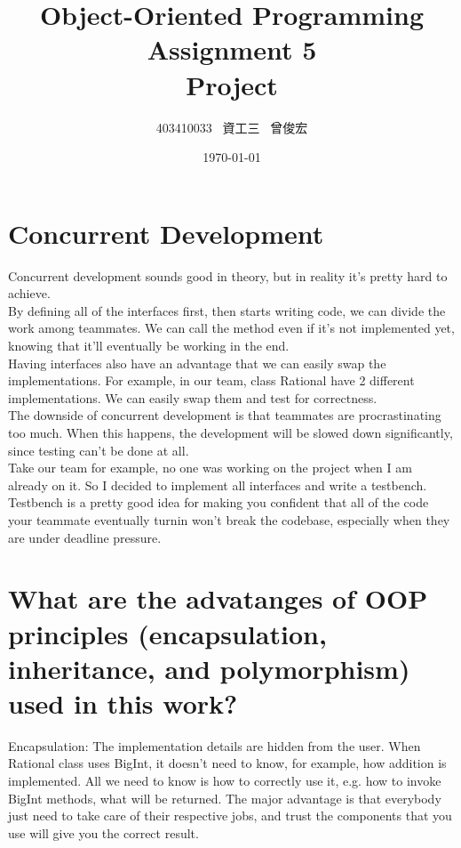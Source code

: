 \documentclass[12pt, A4]{article}
\title{Object-Oriented Programming\\ Assignment 5\\ Project}
\author{403410033 \ 資工三 \ 曾俊宏}
\date{\today}
\begin{document}
	
	\maketitle

    \section{Concurrent Development}
    
    Concurrent development sounds good in theory, but in reality it's pretty hard to achieve.\\
    
    By defining all of the interfaces first, then starts writing code, we can divide the work among teammates. We can call the method even if it's not implemented yet, knowing that it'll eventually be working in the end.\\
    
    Having interfaces also have an advantage that we can easily swap the implementations. For example, in our team, class Rational have 2 different implementations. We can easily swap them and test for correctness.\\
    
    The downside of concurrent development is that teammates are procrastinating too much. When this happens, the development will be slowed down significantly, since testing can't be done at all. \\
    
    Take our team for example, no one was working on the project when I am already on it. So I decided to implement all interfaces and write a testbench. Testbench is a pretty good idea for making you confident that all of the code your teammate eventually turnin won't break the codebase, especially when they are under deadline pressure.
    
    \section{What are the advatanges of OOP principles (encapsulation, inheritance, and polymorphism) used in this work?}
    
    Encapsulation: The implementation details are hidden from the user. When Rational class uses BigInt, it doesn't need to know, for example, how addition is implemented. All we need to know is how to correctly use it, e.g. how to invoke BigInt methods, what will be returned. The major advantage is that everybody just need to take care of their respective jobs, and trust the components that you use will give you the correct result.\\
    
\end{document}

